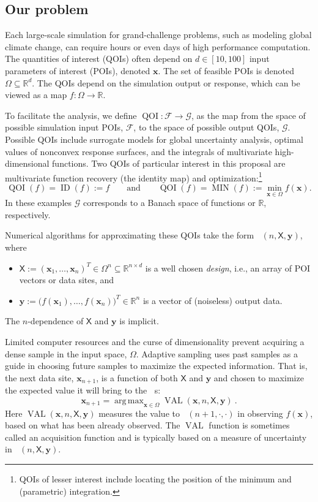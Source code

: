 \documentclass[11pt]{NSFamsart}
\DeclareMathOperator*{\argmax}{arg\,max}
\DeclareMathOperator{\QOI}{QOI}
\DeclareMathOperator{\APP}{\widehat{\QOI}}
\DeclareMathOperator{\VAL}{VAL}
\DeclareMathOperator{\MIN}{MIN}
\DeclareMathOperator{\ID}{ID}
\newcommand{\reals}{{\mathbb{R}}}
\newcommand{\mX}{\mathsf{X}}
\newcommand{\bx}{{\boldsymbol{x}}}
\newcommand{\by}{{\boldsymbol{y}}}
\newcommand{\calf}{{\mathcal{F}}}
\newcommand{\calg}{{\mathcal{G}}}
\begin{document}
\subsection{Our problem}

Each large-scale simulation for grand-challenge problems, such as modeling global climate change, can require hours or even days of high performance computation.  The quantities of interest (QOIs) often depend on $d \in [10, 100]$ input parameters of interest (POIs), denoted $\bx$.  The set of feasible POIs is denoted $\Omega \subseteq \reals^d$.  The QOIs depend on the simulation output or response, which can be viewed as a map $f:\Omega \rightarrow \reals$.   

To facilitate the analysis, we define $\QOI \colon \calf \to \calg$, as the map from the space of possible simulation input POIs, $\calf$,  to the space of possible output QOIs,  $\calg$.  Possible QOIs include surrogate models for global uncertainty analysis, optimal values of nonconvex response surfaces, and the integrals of multivariate high-dimensional functions.   Two QOIs of particular interest in this proposal are multivariate function recovery (the identity map) and optimization:\footnote{QOIs of lesser interest include locating the position of the minimum and (parametric) integration.}  
\begin{equation} \label{eq:ourQOIs}
    \QOI(f) = \ID(f) := f \qquad \text{and} \qquad \QOI(f) = \MIN(f) := \min_{\bx \in \Omega} f(\bx).
\end{equation}
In these examples $\calg$ corresponds to a Banach space of functions or $\reals$, respectively.


Numerical algorithms for approximating these QOIs take the form $\APP(n,\mX,\by)$, where 
\begin{itemize}
    \item $\mX := (\bx_1, \ldots, \bx_n)^T \in \Omega^{n} \subseteq \reals^{n \times d}$ is a well chosen \emph{design}, i.e., an array of POI vectors or data sites, and
    
    \item $\by := \bigl(f(\bx_1), \ldots, f(\bx_n) \bigr)^T \in \reals^n$ is a vector of (noiseless) output data.
\end{itemize}   
The $n$-dependence of $\mX$ and $\by$ is implicit.

Limited computer resources and the curse of dimensionality prevent acquiring a dense sample in the input space, $\Omega$. Adaptive sampling uses past samples as a guide in choosing future samples to maximize the expected information.   That is, the next data site, $\bx_{n+1}$, is a function of both $\mX$ and  $\by$ and chosen to maximize the expected value it will bring to the $\APP$s:
\begin{equation} \label{eq:nextsample}
    \bx_{n+1} = \argmax_{\bx \in \Omega} \VAL(\bx,n,\mX, \by)~.
\end{equation}
Here $\VAL(\bx,n,\mX, \by)$ measures the value to $\APP(n+1,\cdot,\cdot)$ in observing $f(\bx)$, based on what has been already observed.  The $\VAL$ function is sometimes called an acquisition function and is typically based on a measure of uncertainty in $\APP(n,\mX,\by)$.
\end{document}
